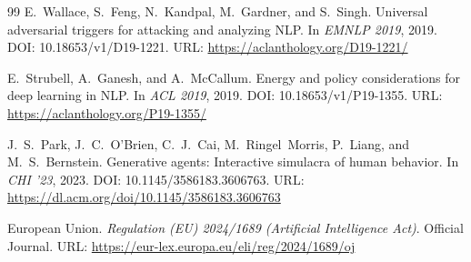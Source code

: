 \documentclass[11pt]{article}
\begin{document}
\begin{thebibliography}{99}
E.~Wallace, S.~Feng, N.~Kandpal, M.~Gardner, and S.~Singh.
\newblock Universal adversarial triggers for attacking and analyzing NLP.
\newblock In \emph{EMNLP 2019}, 2019.
\newblock DOI: 10.18653/v1/D19-1221. URL: \url{https://aclanthology.org/D19-1221/}

E.~Strubell, A.~Ganesh, and A.~McCallum.
\newblock Energy and policy considerations for deep learning in NLP.
\newblock In \emph{ACL 2019}, 2019.
\newblock DOI: 10.18653/v1/P19-1355. URL: \url{https://aclanthology.org/P19-1355/}

J.~S.~Park, J.~C.~O'Brien, C.~J.~Cai, M.~Ringel~Morris, P.~Liang, and M.~S.~Bernstein.
\newblock Generative agents: Interactive simulacra of human behavior.
\newblock In \emph{CHI '23}, 2023.
\newblock DOI: 10.1145/3586183.3606763. URL: \url{https://dl.acm.org/doi/10.1145/3586183.3606763}

European Union.
\newblock \emph{Regulation (EU) 2024/1689 (Artificial Intelligence Act)}.
\newblock Official Journal.
\newblock URL: \url{https://eur-lex.europa.eu/eli/reg/2024/1689/oj}

\end{thebibliography}
\end{document}
